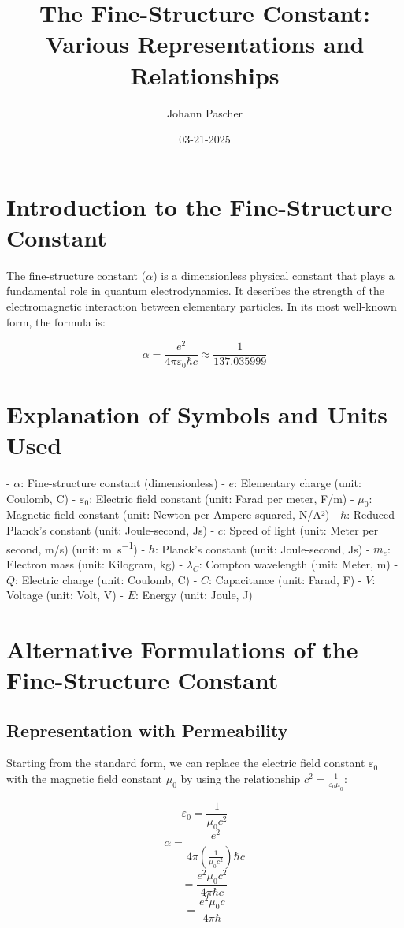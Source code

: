 \documentclass{article}
\title{The Fine-Structure Constant: Various Representations and Relationships}
\author{Johann Pascher}
\date{03-21-2025}
\begin{document}
	
	\maketitle
	
	\section{Introduction to the Fine-Structure Constant}
	
	The fine-structure constant ($\alpha$) is a dimensionless physical constant that plays a fundamental role in quantum electrodynamics. It describes the strength of the electromagnetic interaction between elementary particles. In its most well-known form, the formula is:
	
	$$\alpha = \frac{e^2}{4\pi\varepsilon_0\hbar c} \approx \frac{1}{137.035999}$$
	\tableofcontents
	\section{Explanation of Symbols and Units Used}
	
	- $\alpha$: Fine-structure constant (dimensionless)
	- $e$: Elementary charge (unit: Coulomb, C)
	- $\varepsilon_0$: Electric field constant (unit: Farad per meter, F/m)
	- $\mu_0$: Magnetic field constant (unit: Newton per Ampere squared, N/A²)
	- $\hbar$: Reduced Planck's constant (unit: Joule-second, Js)
	- $c$: Speed of light (unit: Meter per second, m/s)
	(unit: \si{\meter\per\second})
	- $h$: Planck's constant (unit: Joule-second, Js)
	- $m_e$: Electron mass (unit: Kilogram, kg)
	- $\lambda_C$: Compton wavelength (unit: Meter, m)
	- $Q$: Electric charge (unit: Coulomb, C)
	- $C$: Capacitance (unit: Farad, F)
	- $V$: Voltage (unit: Volt, V)
	- $E$: Energy (unit: Joule, J)
	
	\section{Alternative Formulations of the Fine-Structure Constant}
	
	\subsection{Representation with Permeability}
	Starting from the standard form, we can replace the electric field constant $\varepsilon_0$ with the magnetic field constant $\mu_0$ by using the relationship $c^2 = \frac{1}{\varepsilon_0\mu_0}$:
	
	$$\varepsilon_0 = \frac{1}{\mu_0c^2}$$
	$$\alpha = \frac{e^2}{4\pi\left(\frac{1}{\mu_0c^2}\right)\hbar c}$$
	$$= \frac{e^2\mu_0c^2}{4\pi\hbar c}$$
	$$= \frac{e^2\mu_0c}{4\pi\hbar}$$
	
\end{document}
